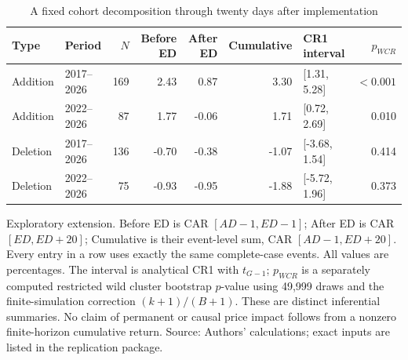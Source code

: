 \begin{table}[!htbp]
\centering
\caption{A fixed cohort decomposition through twenty days after implementation}\label{tab:horizon}
\small
\setlength{\tabcolsep}{5pt}
\begin{tabular}{llrrrrlr}
\toprule
Type & Period & $N$ & Before ED & After ED & Cumulative & CR1 interval & $p_{WCR}$ \\
\midrule
Addition & 2017--2026 & 169 & 2.43 & 0.87 & 3.30 & [1.31, 5.28] & $<0.001$ \\
Addition & 2022--2026 & 87 & 1.77 & -0.06 & 1.71 & [0.72, 2.69] & 0.010 \\
Deletion & 2017--2026 & 136 & -0.70 & -0.38 & -1.07 & [-3.68, 1.54] & 0.414 \\
Deletion & 2022--2026 & 75 & -0.93 & -0.95 & -1.88 & [-5.72, 1.96] & 0.373 \\
\bottomrule
\end{tabular}
\begin{minipage}{\linewidth}\footnotesize\vspace{5pt}
Exploratory extension. Before ED is CAR $[AD-1,ED-1]$; After ED is CAR $[ED,ED+20]$; Cumulative is their event-level sum, CAR $[AD-1,ED+20]$. Every entry in a row uses exactly the same complete-case events. All values are percentages. The interval is analytical CR1 with $t_{G-1}$; $p_{WCR}$ is a separately computed restricted wild cluster bootstrap $p$-value using 49,999 draws and the finite-simulation correction $(k+1)/(B+1)$. These are distinct inferential summaries. No claim of permanent or causal price impact follows from a nonzero finite-horizon cumulative return. Source: Authors' calculations; exact inputs are listed in the replication package.
\end{minipage}
\end{table}

